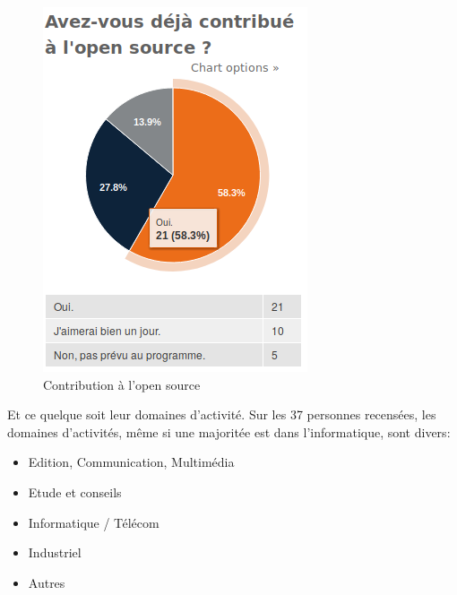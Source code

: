 		\begin{figure}[h]
			\center
			\includegraphics[scale=0.58]{./img/a4}
			\caption{Contribution à l'open source}
		\end{figure}

		\newpage

		Et ce quelque soit leur domaines d'activité. Sur les 37 personnes recensées, les domaines d'activités, même si une majoritée est dans l'informatique, sont divers:

		\begin{itemize}[label=\textbullet, font=\LARGE \color{burntorange}]
			\item Edition, Communication, Multimédia
			\item Etude et conseils
			\item Informatique / Télécom
			\item Industriel
			\item Autres
		\end{itemize}

